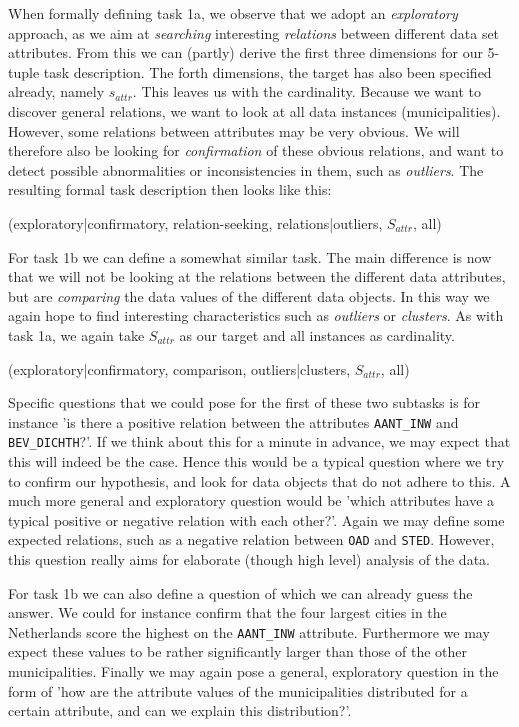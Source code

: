 When formally defining task 1a, we observe that we adopt an \textit{exploratory} approach, as we aim at \textit{searching} interesting \textit{relations} between different data set attributes. From this we can (partly) derive the first three dimensions for our 5-tuple task description. The forth dimensions, the target has also been specified already, namely $s_{attr}$. This leaves us with the cardinality. Because we want to discover general relations, we want to look at all data instances (municipalities). However, some relations between attributes may be very obvious. We will therefore also be looking for \textit{confirmation} of these obvious relations, and want to detect possible abnormalities or inconsistencies in them, such as \textit{outliers}. The resulting formal task description then looks like this:

(exploratory|confirmatory, relation-seeking, relations|outliers, $S_{attr}$, all)

For task 1b we can define a somewhat similar task. The main difference is now that we will not be looking at the relations between the different data attributes, but are \textit{comparing} the data values of the different data objects. In this way we again hope to find interesting characteristics such as \textit{outliers} or \textit{clusters}. As with task 1a, we again take $S_{attr}$ as our target and all instances as cardinality.

(exploratory|confirmatory, comparison, outliers|clusters, $S_{attr}$, all)

Specific questions that we could pose for the first of these two subtasks is for instance 'is there a positive relation between the attributes \texttt{AANT\_INW} and \texttt{BEV\_DICHTH}?'. If we think about this for a minute in advance, we may expect that this will indeed be the case. Hence this would be a typical question where we try to confirm our hypothesis, and look for data objects that do not adhere to this. A much more general and exploratory question would be 'which attributes have a typical positive or negative relation with each other?'. Again we may define some expected relations, such as a negative relation between \texttt{OAD} and \texttt{STED}. However, this question really aims for elaborate (though high level) analysis of the data.

For task 1b we can also define a question of which we can already guess the answer. We could for instance confirm that the four largest cities in the Netherlands score the highest on the \texttt{AANT\_INW} attribute. Furthermore we may expect these values to be rather significantly larger than those of the other municipalities. Finally we may again pose a general, exploratory question in the form of 'how are the attribute values of the municipalities distributed for a certain attribute, and can we explain this distribution?'.




